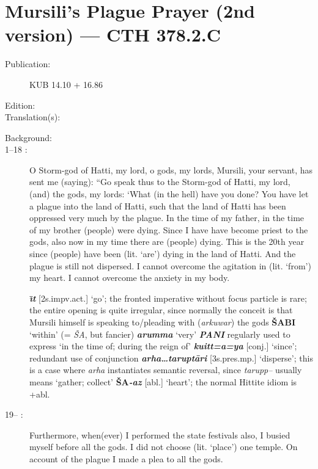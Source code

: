 \documentclass[10pt]{article}
\newcommand{\bit}[1]{\textbf{\textit{#1}}}				%
\newcommand{\p}[1]{{\tiny[{#1}]}}					%
\newcommand{\I}{\={\i}}									%
\renewcommand{\.}[1]{\textsubdot{#1}}
\begin{document}
\section{Mursili's Plague Prayer (2nd version) --- CTH 378.2.C}

\begin{description}

\item[Publication:] KUB 14.10 + 16.86
\item[Edition:]
\item[Translation(s):] \citet[57ff.]{singer2002hittite}
\item[Background:] 

\bigskip

\item[1--18 :] O Storm-god of Hatti, my lord, o gods, my lords, Mursili, your servant, has sent me (saying): ``Go speak thus to the Storm-god of Hatti, my lord, (and) the gods, my lords: `What (in the hell) have you done? You have let a plague into the land of Hatti, such that the land of Hatti has been oppressed very much by the plague. In the time of my father, in the time of my brother (people) were dying. Since I have have become priest to the gods, also now in my time there are (people) dying. This is the 20th year since (people) have been (lit. `are') dying in the land of Hatti. And the plague is still not dispersed. I cannot overcome the agitation in (lit. `from') my heart. I cannot overcome the anxiety in my body.

\begin{notes}

\bit{{\I}t} \p{2s.impv.act.} `go'; the fronted imperative without focus particle is rare; the entire opening is quite irregular, since normally the conceit is that Mursili himself is speaking to/pleading with (\textit{arkuwar}) the gods \textbf{\v{S}ABI} `within' (= \textit{\v{S}A}, but fancier) \bit{arumma} `very' \bit{PANI} regularly used to express `in the time of; during the reign of' \bit{kuitt=a=ya} \p{conj.} `since'; redundant use of conjunction \bit{arha{\ldots}tarupt\=ari} \p{3s.pres.mp.} `disperse'; this is a case where \textit{arha} instantiates semantic reversal, since \textit{tarupp--} usually means `gather; collect' \textbf{\v{S}A}\bit{-az} \p{abl.} `heart'; the normal Hittite idiom is +abl. 

\end{notes}

\item[19-- :] Furthermore, when(ever) I performed the state festivals also, I busied myself before all the gods. I did not choose (lit. `place') one temple. On account of the plague I made a plea to all the gods. 


\end{description}
\end{document}
